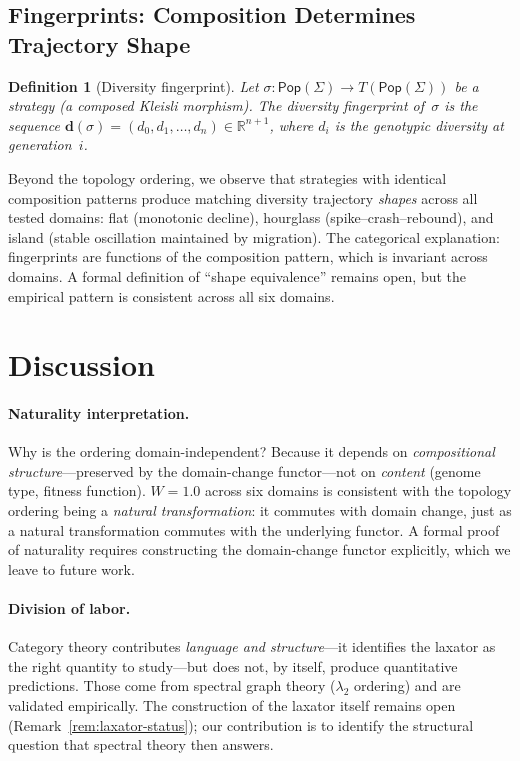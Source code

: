 \documentclass[submission,copyright,creativecommons]{eptcs}
\newtheorem{definition}{Definition}
\begin{document}
\subsection{Fingerprints: Composition Determines Trajectory Shape}

\begin{definition}[Diversity fingerprint]
\label{def:fingerprint}
Let $\sigma : \mathsf{Pop}(\Sigma) \to T(\mathsf{Pop}(\Sigma))$ be a
strategy (a composed Kleisli morphism). The \emph{diversity fingerprint}
of~$\sigma$ is the sequence
$\mathbf{d}(\sigma) = (d_0, d_1, \ldots, d_n) \in \mathbb{R}^{n+1}$,
where $d_i$ is the genotypic diversity at generation~$i$.
\end{definition}

Beyond the topology ordering, we observe that strategies with
identical composition patterns produce matching diversity trajectory
\emph{shapes} across all tested domains: flat (monotonic decline),
hourglass (spike--crash--rebound), and island (stable oscillation
maintained by migration).
The categorical explanation: fingerprints are functions of the
composition pattern, which is invariant across domains. A formal
definition of ``shape equivalence'' remains open, but the empirical
pattern is consistent across all six domains.

\section{Discussion}
\label{sec:discussion}

\paragraph{Naturality interpretation.}
Why is the ordering domain-independent? Because it depends on
\emph{compositional structure}---preserved by the domain-change
functor---not on \emph{content} (genome type, fitness function).
$W = 1.0$ across six domains is consistent with the topology ordering
being a \emph{natural transformation}: it commutes with domain change,
just as a natural transformation commutes with the underlying functor.
A formal proof of naturality requires constructing the domain-change
functor explicitly, which we leave to future work.

\paragraph{Division of labor.}
Category theory contributes \emph{language and structure}---it
identifies the laxator as the right quantity to study---but does not,
by itself, produce quantitative predictions. Those come from spectral
graph theory ($\lambda_2$ ordering) and are validated empirically.
The construction of the laxator itself remains open
(Remark~\ref{rem:laxator-status}); our contribution is to identify
the structural question that spectral theory then answers.
\end{document}
